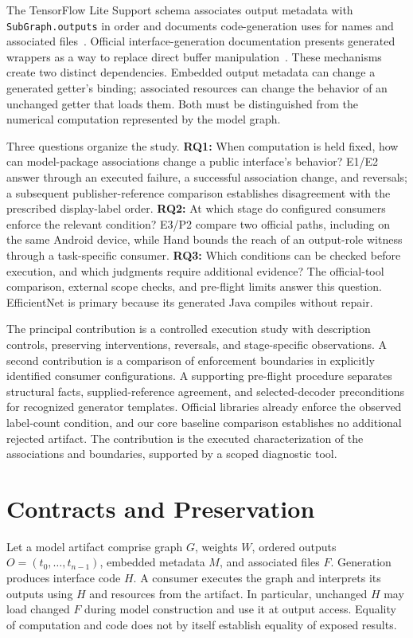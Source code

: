 \documentclass[10pt,twocolumn,letterpaper]{article}
\newcommand{\code}[1]{\texttt{#1}}
\begin{document}
The TensorFlow Lite Support schema associates output metadata with \code{SubGraph.outputs} in order and documents code-generation uses for names and associated files~\cite{schema}. Official interface-generation documentation presents generated wrappers as a way to replace direct buffer manipulation~\cite{codegen-doc}. These mechanisms create two distinct dependencies. Embedded output metadata can change a generated getter's binding; associated resources can change the behavior of an unchanged getter that loads them. Both must be distinguished from the numerical computation represented by the model graph.

Three questions organize the study. \textbf{RQ1:} When computation is held fixed, how can model-package associations change a public interface's behavior? E1/E2 answer through an executed failure, a successful association change, and reversals; a subsequent publisher-reference comparison establishes disagreement with the prescribed display-label order. \textbf{RQ2:} At which stage do configured consumers enforce the relevant condition? E3/P2 compare two official paths, including on the same Android device, while Hand bounds the reach of an output-role witness through a task-specific consumer. \textbf{RQ3:} Which conditions can be checked before execution, and which judgments require additional evidence? The official-tool comparison, external scope checks, and pre-flight limits answer this question. EfficientNet is primary because its generated Java compiles without repair.

The principal contribution is a controlled execution study with description controls, preserving interventions, reversals, and stage-specific observations. A second contribution is a comparison of enforcement boundaries in explicitly identified consumer configurations. A supporting pre-flight procedure separates structural facts, supplied-reference agreement, and selected-decoder preconditions for recognized generator templates. Official libraries already enforce the observed label-count condition, and our core baseline comparison establishes no additional rejected artifact. The contribution is the executed characterization of the associations and boundaries, supported by a scoped diagnostic tool.

\section{Contracts and Preservation}
\label{sec:contracts}
Let a model artifact comprise graph $G$, weights $W$, ordered outputs $O=(t_0,\ldots,t_{n-1})$, embedded metadata $M$, and associated files $F$. Generation produces interface code $H$. A consumer executes the graph and interprets its outputs using $H$ and resources from the artifact. In particular, unchanged $H$ may load changed $F$ during model construction and use it at output access. Equality of computation and code does not by itself establish equality of exposed results.
\end{document}
